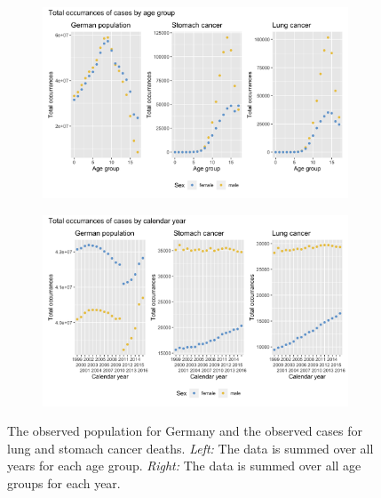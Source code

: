 \begin{figure}
    \centering
    \begin{subfigure}[b]{.6\linewidth}
        \includegraphics[width=\linewidth]{real-data/real-data-univariate/Figures/data-age-total.png}
    \end{subfigure}
    
    \begin{subfigure}[b]{.6\linewidth}
        \includegraphics[width=\linewidth]{real-data/real-data-univariate/Figures/data-year-total.png}
    \end{subfigure}
    \caption{The observed population for Germany and the observed cases for lung and stomach cancer deaths. \textit{Left:} The data is summed over all years for each age group. \textit{Right:} The data is summed over all age groups for each year. }
    \label{fig:data-total}
\end{figure}

